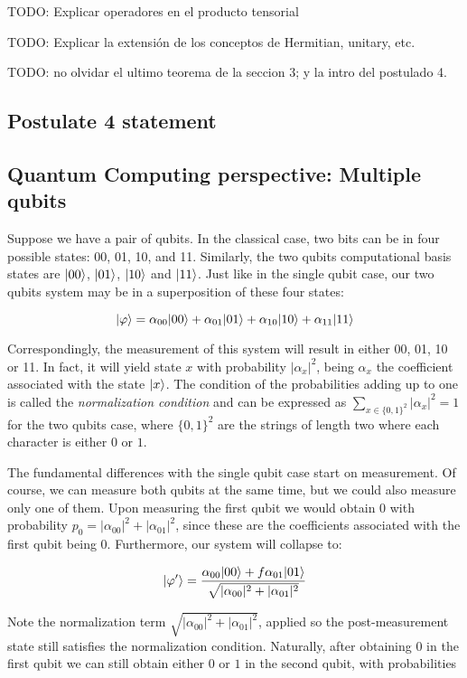 TODO: Explicar operadores en el producto tensorial

TODO: Explicar la extensión de los conceptos de Hermitian, unitary, etc.

TODO: no olvidar el ultimo teorema de la seccion 3; y la intro del postulado 4.

\subsection{Postulate 4 statement}



\subsection{Quantum Computing perspective: Multiple qubits}


Suppose we have a pair of qubits. In the classical case, two bits can be in four possible states: 00, 01, 10, and 11. Similarly, the two qubits computational basis states are $|00\rangle$, $|01\rangle$, $|10\rangle$ and $|11\rangle$. Just like in the single qubit case, our two qubits system may be in a superposition of these four states:

$$ |\varphi\rangle = \alpha_{00} |00\rangle + \alpha_{01} |01\rangle + \alpha_{10} |10\rangle + \alpha_{11} |11\rangle $$

Correspondingly, the measurement of this system will result in either 00, 01, 10 or 11. In fact, it will yield state $x$ with probability $|\alpha_x|^2$, being $\alpha_x$ the coefficient associated with the state $|x\rangle$. The condition of the probabilities adding up to one is called the \emph{normalization condition} and can be expressed as $\sum_{x \in \{0,1\}^2} |\alpha_x|^2 = 1$ for the two qubits case, where $\{0,1\}^2$ are the strings of length two where each character is either $0$ or $1$.

The fundamental differences with the single qubit case start on measurement. Of course, we can measure both qubits at the same time, but we could also measure only one of them. Upon measuring the first qubit we would obtain $0$ with probability $p_0 = |\alpha_{00}|^2 + |\alpha_{01}|^2$, since these are the coefficients associated with the first qubit being $0$. Furthermore, our system will collapse to:

$$ |\varphi'\rangle = \frac{ \alpha_{00} |00\rangle +f \alpha_{01} |01\rangle }{ \sqrt{|\alpha_{00}|^2 + |\alpha_{01}|^2} } $$

Note the normalization term $\sqrt{|\alpha_{00}|^2 + |\alpha_{01}|^2}$, applied so the post-measurement state still satisfies the normalization condition. Naturally, after obtaining $0$ in the first qubit we can still obtain either $0$ or $1$ in the second qubit, with probabilities 

